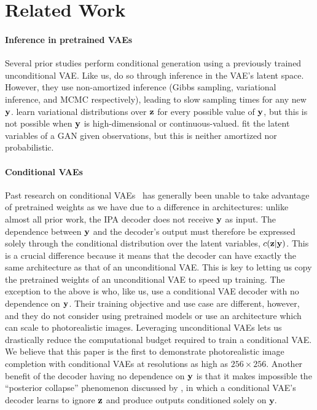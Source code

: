 \section{Related Work}
\paragraph{Inference in pretrained VAEs}
Several prior studies perform conditional generation using a previously trained
unconditional VAE.
%
Like us, \citet{rezende2014stochastic,nguyen2016plug,wu2018conditional} do so
through inference in the VAE's latent space. However, they use non-amortized
inference (Gibbs sampling, variational inference, and MCMC respectively),
leading to slow sampling times for any new $\mathbf{y}{}$.
%
\citet{duan2019pre} learn variational distributions over $\mathbf{z}{}$ for every possible
value of $\mathbf{y}{}$, but this is not possible when $\mathbf{y}{}$ is
high-dimensional or continuous-valued.
%
\citet{yeh2017semantic} fit the latent variables of a GAN given observations,
but this is neither amortized nor probabilistic.
%

\paragraph{Conditional VAEs}
Past research on conditional
VAEs~\citep{sohn2015learning,zheng2019pluralistic,ivanov2018variational,wan2021high}
has generally been unable to take advantage of pretrained weights as we have due
to a difference in architectures: unlike almost all prior work, the IPA decoder
does not receive $\mathbf{y}{}$ as input. The dependence between $\mathbf{y}{}$ and the
decoder's output must therefore be expressed solely through the conditional
distribution over the latent variables, $c{}(\mathbf{z}{}|\mathbf{y}{})$. This is a crucial
difference because it means that the decoder can have exactly the same
architecture as that of an unconditional VAE. This is key to letting us copy the
pretrained weights of an unconditional VAE to speed up training. The exception
to the above is \citet{ma2018eddi} who, like us, use a conditional VAE decoder
with no dependence on $\mathbf{y}{}$. Their training objective and use case are
different, however, and they do not consider using pretrained models or use an
architecture which can scale to photorealistic images. Leveraging unconditional
VAEs lets us drastically reduce the computational budget required to train a
conditional VAE. We believe that this paper is the first to demonstrate
photorealistic image completion with conditional VAEs at resolutions as high as
$256\times256$.
% 
Another benefit of the decoder having no dependence on $\mathbf{y}{}$ is that it
makes impossible the ``posterior collapse'' phenomenon discussed by
\citet{zheng2019pluralistic}, in which a conditional VAE's decoder learns to
ignore $\mathbf{z}{}$ and produce outputs conditioned solely on $\mathbf{y}$.


